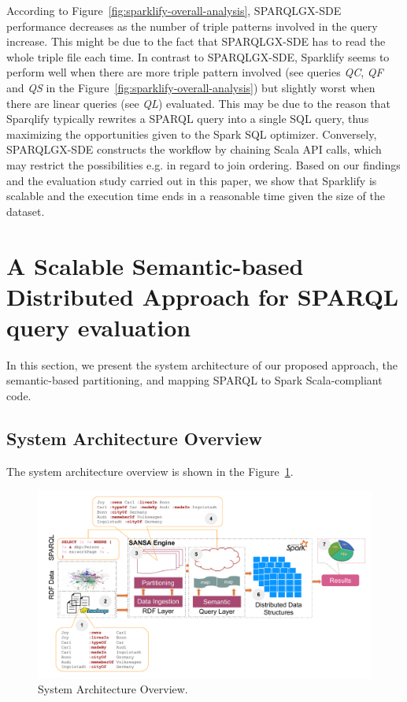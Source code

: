 According to Figure~\ref{fig:sparklify-overall-analysis}, SPARQLGX-SDE performance decreases as the number of triple patterns involved in the query increase.
This might be due to the fact that SPARQLGX-SDE has to read the whole triple file each time.
In contrast to SPARQLGX-SDE, Sparklify seems to perform well when there are more triple pattern involved (see queries \textit{QC}, \textit{QF} and \textit{QS} in the Figure~\ref{fig:sparklify-overall-analysis}) but slightly worst when there are linear queries (see \textit{QL}) evaluated. 
This may be due to the reason that Sparqlify typically rewrites a SPARQL query into a single SQL query, thus maximizing the opportunities given to the Spark SQL optimizer. Conversely, SPARQLGX-SDE constructs the workflow by chaining Scala API calls, which may restrict the possibilities e.g. in regard to join ordering.
Based on our findings and the evaluation study carried out in this paper, we show that Sparklify is scalable and the execution time ends in a reasonable time given the size of the dataset.


\section{A Scalable Semantic-based Distributed Approach for SPARQL query evaluation}
\label{sec:semantic-based-approach}

In this section, we present the system architecture of our proposed approach, the semantic-based partitioning, and mapping SPARQL to Spark Scala-compliant code.

\subsection{System Architecture Overview}
The system architecture overview is shown in the Figure~\ref{fig:semantic-based-architecture}.

\begin{figure}
\centering
\includegraphics[width=1.0\columnwidth]{images/6_scalable_rdf_querying/semantic-based-architecture.pdf}
\caption{System Architecture Overview.}
\label{fig:semantic-based-architecture}
\end{figure}

